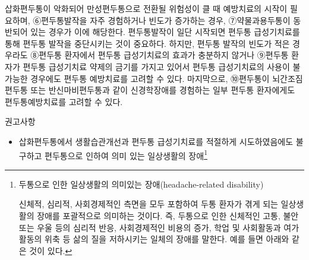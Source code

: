 \documentclass[]{book}
\let\rmarkdownfootnote\footnote%
\def\footnote{\protect\rmarkdownfootnote}
\begin{document}
삽화편두통이 악화되어 만성편두통으로 전환될 위험성이 클 때 예방치료의 시작이 필요하며, ⑥편두통발작을 자주 경험하거나 빈도가 증가하는 경우, ⑦약물과용두통이 동반되어 있는 경우가 이에 해당한다. 편두통발작이 일단 시작되면 편두통 급성기치료를 통해 편두통 발작을 중단시키는 것이 중요하다. 하지만, 편두통 발작의 빈도가 적은 경우라도 ⑧편두통 환자에서 편두통 급성기치료의 효과가 충분하지 않거나 ⑨편두통 환자가 편두통 급성기치료 약제의 금기를 가지고 있어서 편두통 급성기치료의 사용이 불가능한 경우에도 편두통 예방치료를 고려할 수 있다. 마지막으로, ⑩편두통이 뇌간조짐편두통 또는 반신마비편두통과 같이 신경학장애를 경험하는 일부 편두통 환자에게도 편두통예방치료를 고려할 수 있다.

권고사항

\begin{itemize}
\item
  삽화편두통에서 생활습관개선과 편두통 급성기치료를 적절하게 시도하였음에도 불구하고 편두통으로 인하여 의미 있는 일상생활의 장애\footnote{두통으로 인한 일상생활의 의미있는 장애(headache-related disability)

    신체적, 심리적, 사회경제적인 측면을 모두 포함하여 두통 환자가 겪게 되는 일상생활의 장애를 포괄적으로 의미하는 것이다. 즉, 두통으로 인한 신체적인 고통, 불안 또는 우울 등의 심리적 반응, 사회경제적인 비용의 증가, 학업 및 사회활동과 여가활동의 위축 등 삶의 질을 저하시키는 일체의 장애를 말한다. 예를 들면 아래와 같은 것이 있다.

}
\end{itemize}
\end{document}
